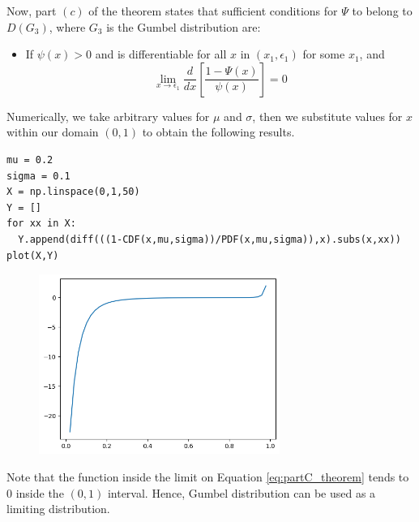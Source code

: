 Now, part $(c)$ of the theorem states that sufficient conditions for $\Psi$ to belong to $D(G_3)$, where $G_3$ is the Gumbel distribution are:

\begin{itemize}
\item If $\psi(x) >0$ and is differentiable for all $x$ in $(x_1,\epsilon_1)$ for some $x_1$, and
\begin{equation} \label{eq:partC_theorem}
\lim_{x \rightarrow \epsilon_1} \frac{d}{dx} \left[ \frac{1-\Psi(x)}{\psi(x)} \right] = 0
\end{equation}
\end{itemize}

Numerically, we take arbitrary values for $\mu$ and $\sigma$, then we substitute values for $x$ within our domain $(0,1)$ to obtain the following results.

\begin{verbatim}
mu = 0.2
sigma = 0.1
X = np.linspace(0,1,50)
Y = []
for xx in X:
  Y.append(diff(((1-CDF(x,mu,sigma))/PDF(x,mu,sigma)),x).subs(x,xx))
plot(X,Y)
\end{verbatim}

\begin{figure}[htbp!]
\centering
\includegraphics[width=0.7\textwidth]{images/th1052_gumbel_verify.png}
\label{fig:gumbel_verify}
\end{figure}

Note that the function inside the limit on Equation \ref{eq:partC_theorem} tends to $0$ inside the $(0,1)$ interval. Hence, Gumbel distribution can be used as a limiting distribution.